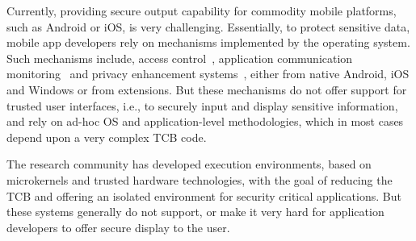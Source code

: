 
Currently, providing secure output capability for commodity mobile platforms, such as Android or iOS, is very challenging. Essentially, to protect sensitive data, mobile app developers rely on mechanisms implemented by the operating system. Such mechanisms include, access control~\cite{smalley2013security,bugiel2011practical,nauman2010apex,kern2012permission,conti2011crepe,russello2012moses,heuser2014asm,backes2014android,wang2015deepdroid,drm}, application communication monitoring~\cite{ongtang2012semantically,dietz2011quire,bugiel2011xmandroid} and privacy enhancement systems~\cite{beresford2011mockdroid,zhou2011taming,shebaro2014identidroid,enck2014taintdroid}, either from native Android, iOS and Windows or from extensions. But these mechanisms do not offer support for trusted user interfaces, i.e., to securely input and display sensitive information, and rely on ad-hoc \ac{OS} and application-level methodologies, which in most cases depend upon a very complex \ac{TCB} code.

The research community has developed execution environments, based on microkernels and trusted hardware technologies, with the goal of reducing the \ac{TCB} and offering an isolated environment for security critical applications. But these systems generally do not support, or make it very hard for application developers to offer secure display to the user.

